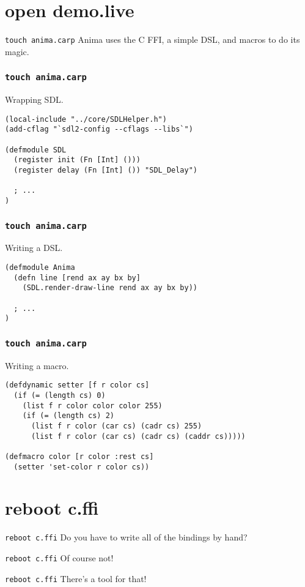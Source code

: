\documentclass[aspectratio=169]{beamer}
\begin{document}
  \section{open demo.live}
  \begin{frame}{\texttt{touch anima.carp}}
    Anima uses the C FFI, a simple DSL, and macros to do its magic.
  \end{frame}
  \begin{frame}[fragile]
    \frametitle{\texttt{touch anima.carp}}
    \begin{listing}[H]
      \caption{Wrapping SDL.}
      \begin{verbatim}
(local-include "../core/SDLHelper.h")
(add-cflag "`sdl2-config --cflags --libs`")

(defmodule SDL
  (register init (Fn [Int] ()))
  (register delay (Fn [Int] ()) "SDL_Delay")

  ; ...
)
      \end{verbatim}
    \end{listing}
  \end{frame}
  \begin{frame}[fragile]
    \frametitle{\texttt{touch anima.carp}}
    \begin{listing}[H]
      \caption{Writing a DSL.}
      \begin{verbatim}
(defmodule Anima
  (defn line [rend ax ay bx by]
    (SDL.render-draw-line rend ax ay bx by))

  ; ...
)
      \end{verbatim}
    \end{listing}
  \end{frame}
  \begin{frame}[fragile]
    \frametitle{\texttt{touch anima.carp}}
    \begin{listing}[H]
      \caption{Writing a macro.}
      \begin{verbatim}
(defdynamic setter [f r color cs]
  (if (= (length cs) 0)
    (list f r color color color 255)
    (if (= (length cs) 2)
      (list f r color (car cs) (cadr cs) 255)
      (list f r color (car cs) (cadr cs) (caddr cs)))))

(defmacro color [r color :rest cs]
  (setter 'set-color r color cs))
      \end{verbatim}
    \end{listing}
  \end{frame}
  \section{reboot c.ffi}
  \begin{frame}{\texttt{reboot c.ffi}}
    Do you have to write all of the bindings by hand?
  \end{frame}
  \begin{frame}{\texttt{reboot c.ffi}}
    Of course not!
  \end{frame}
  \begin{frame}{\texttt{reboot c.ffi}}
    There’s a tool for that!
  \end{frame}
\end{document}

